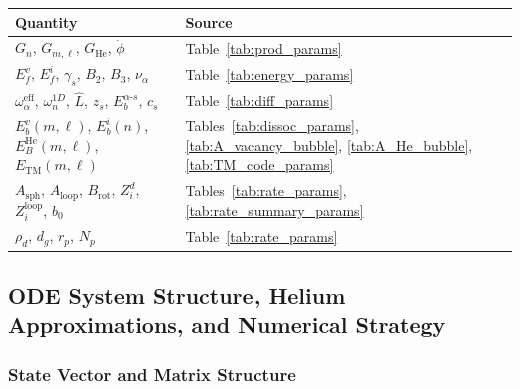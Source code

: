 \documentclass[pdflatex,sn-basic]{sn-jnl} %
\begin{document}
\begin{center}
\renewcommand{\arraystretch}{1.2}
\begin{tabular}{@{}ll@{}}
\toprule
\textbf{Quantity} & \textbf{Source} \\
\midrule
$G_n$, $G_{m,\ell}$, $G_{\mathrm{He}}$, $\dot{\phi}$
  & Table~\ref{tab:prod_params} \\
$E_f^v$, $E_f^i$, $\gamma_s$, $B_2$, $B_3$, $\nu_\alpha$
  & Table~\ref{tab:energy_params} \\
$\omega_\alpha^{\mathrm{eff}}$, $\omega_n^{1D}$, $\hat{L}$,
  $z_s$, $E_b^{\alpha\text{-}s}$, $c_s$
  & Table~\ref{tab:diff_params} \\
$E_b^v(m,\ell)$, $E_b^i(n)$, $E_B^{\mathrm{He}}(m,\ell)$,
  $E_{\mathrm{TM}}(m,\ell)$
  & Tables~\ref{tab:dissoc_params},
    \ref{tab:A_vacancy_bubble},
    \ref{tab:A_He_bubble},
    \ref{tab:TM_code_params} \\
$A_{\mathrm{sph}}$, $A_{\mathrm{loop}}$, $B_{\mathrm{rot}}$,
  $Z_i^d$, $Z_i^{\mathrm{loop}}$, $b_0$
  & Tables~\ref{tab:rate_params},
    \ref{tab:rate_summary_params} \\
$\rho_d$, $d_g$, $r_p$, $N_p$
  & Table~\ref{tab:rate_params} \\
\bottomrule
\end{tabular}
\end{center}


\subsection{ODE System Structure, Helium Approximations, and Numerical Strategy}
\label{sec:system_size}

\subsubsection{State Vector and Matrix Structure}
\label{sec:matrix_structure}
\end{document}
